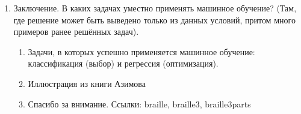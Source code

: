 \documentclass[a4paper,12pt]{article} %
\begin{document}
\begin{enumerate}
	\item{} Заключение. В каких задачах уместно применять машинное обучение? (Там, где решение может быть выведено только из данных условий, притом много примеров ранее решённых задач).
	\begin{enumerate}
		\item Задачи, в которых успешно применяется машинное обучение: классификация (выбор) и регрессия (оптимизация).
		\item Иллюстрация из книги Азимова
		\item Спасибо за внимание. Ссылки: braille, braille3, braille3parts
	\end{enumerate}
	
\end{enumerate}
\end{document}
